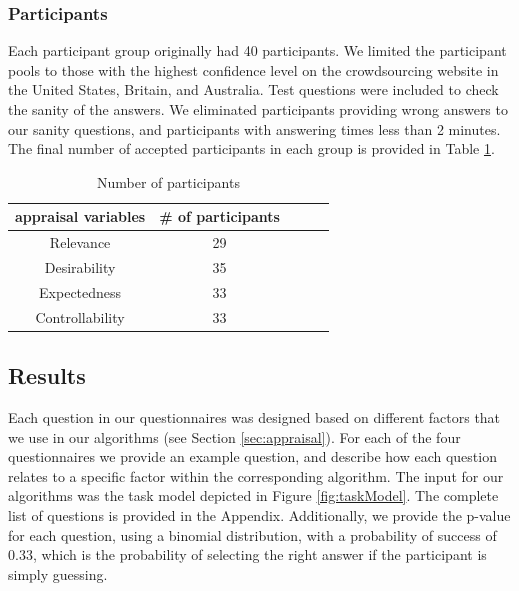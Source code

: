 \documentclass[12pt]{report}
\begin{document}
\subsubsection{Participants}
Each participant group originally had 40 participants. We limited the
participant pools to those with the highest confidence level on the
crowdsourcing website in the United States, Britain, and Australia. Test
questions were included to check the sanity of the answers. We eliminated
participants providing wrong answers to our sanity questions, and participants with
answering times less than 2 minutes. The final number of accepted participants
in each group is provided in Table \ref{tbl:statistics}.

\begin{table}[htbp]
\centering
\caption{Number of participants}
\begin{tabular}{|c|c|c|c|c|} \hline
appraisal variables & \# of participants\\ \hline 
Relevance &  29\\ \hline
Desirability & 35\\ \hline 
Expectedness & 33\\ \hline 
Controllability & 33\\ \hline
\end{tabular}
\label{tbl:statistics}
\end{table}

% 

\subsection{Results}
\label{sec:results-crowdsourcing}
Each question in our questionnaires was designed based on different factors that
we use in our algorithms (see Section \ref{sec:appraisal}).  For each of the
four questionnaires we provide an example question, and describe how each
question relates to a specific factor within the corresponding algorithm. The
input for our algorithms was the task model depicted in Figure
\ref{fig:taskModel}. The complete list of questions is provided in the Appendix.
Additionally, we provide the p-value for each question, using a binomial
distribution, with a probability of success of 0.33, which is the probability of
selecting the right answer if the participant is simply guessing.
\end{document}
